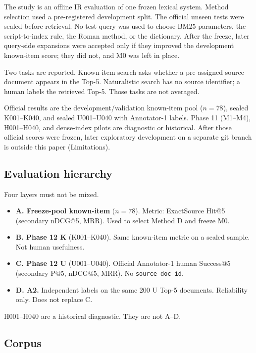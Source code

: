 \documentclass[10pt,letterpaper]{article}
\begin{document}
The study is an offline IR evaluation of one frozen lexical system. Method selection used a pre-registered development split. The official unseen tests were sealed before retrieval. No test query was used to choose BM25 parameters, the script-to-index rule, the Roman method, or the dictionary. After the freeze, later query-side expansions were accepted only if they improved the development known-item score; they did not, and M0 was left in place.

Two tasks are reported. Known-item search asks whether a pre-assigned source document appears in the Top-5. Naturalistic search has no source identifier; a human labels the retrieved Top-5. Those tasks are not averaged.

Official results are the development/validation known-item pool ($n = 78$), sealed K001--K040, and sealed U001--U040 with Annotator-1 labels. Phase 11 (M1--M4), H001--H040, and dense-index pilots are diagnostic or historical. After those official scores were frozen, later exploratory development on a separate git branch is outside this paper (Limitations).

\subsection*{Evaluation hierarchy}

Four layers must not be mixed.

\begin{itemize}
\item \textbf{A. Freeze-pool known-item} ($n = 78$). Metric: ExactSource Hit@5 (secondary nDCG@5, MRR). Used to select Method D and freeze M0.
\item \textbf{B. Phase 12 K} (K001--K040). Same known-item metric on a sealed sample. Not human usefulness.
\item \textbf{C. Phase 12 U} (U001--U040). Official Annotator-1 human Success@5 (secondary P@5, nDCG@5, MRR). No \texttt{source\_doc\_id}.
\item \textbf{D. A2.} Independent labels on the same 200 U Top-5 documents. Reliability only. Does not replace C.
\end{itemize}

H001--H040 are a historical diagnostic. They are not A--D.

\subsection*{Corpus}
\end{document}
